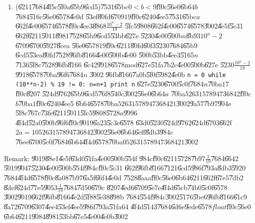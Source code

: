 \documentclass{article}
\begin{document}
\begin{enumerate}
\item (\U{6211}\U{7684}\U{4f5c}\U{5f0a}\U{65b9}\U{6cd5})\U{7531}\U{65bc}$%
0<b<9$\U{ff0c}\U{56e0}\U{6b64}$b$\U{7684}\U{516c}\U{56e0}\U{6578}\U{4e0d}%
\U{53ef}\U{80fd}\U{6709}$19$\U{ff0c}\U{6240}\U{4ee5}\U{7531}\U{65bc}$a$%
\U{662f}\U{4e00}\U{6574}\U{6578}\U{ff0c}\U{4ee3}\U{8868}$\frac{10^{n}-2}{19}$%
\U{5fc5}\U{9808}\U{662f}\U{4e00}\U{6574}\U{6578}\U{3002}\U{4e5f}\U{5c31}%
\U{662f}\U{6211}\U{5011}\U{8981}\U{7528}\U{65b9}\U{6cd5}\U{53bb}\U{627e}%
\U{5230}\U{4e00}\U{500b}$n$\U{8b93}$10^{n}-2$\U{6709}\U{6700}\U{5927}\U{8cea}%
\U{56e0}\U{6578}$19$\U{ff0c}\U{6211}\U{80fd}\U{60f3}\U{5230}\U{7684}\U{65b9}%
\U{6cd5}\U{53ea}\U{80fd}\U{7528}\U{96fb}\U{8166}\U{4e00}\U{500b}\U{4e00}%
\U{500b}\U{53bb}\U{4ee3}\U{5165}$n$\U{7136}\U{5f8c}\U{7528}\U{96fb}\U{8166}%
\U{6c42}\U{9918}\U{6578}mod\U{627e}\U{51fa}\U{7b2c}\U{4e00}\U{500b}\U{627e}%
\U{5230}$\frac{10^{n}-2}{19}$\U{9918}\U{6578}\U{70ba}\U{96f6}\U{7684}$n$%
\U{3002}\newline
\U{96fb}\U{8166}\U{7a0b}\U{5f0f}\U{5982}\U{4e0b}\newline
\texttt{n = 0\newline
while (10**n-2) \% 19 != 0:\newline
\quad n=n+1\newline
print n}\newline
\U{627e}\U{5230}\U{6700}\U{5c0f}\U{7684}$n$\U{70ba}$17$\U{ff0c}\U{8207}%
\U{524d}\U{9762}\U{65b9}\U{6cd5}\U{76f8}\U{540c}\U{3002}\U{56e0}\U{6b64}$a$%
\U{70ba}$5263157894736842$\U{ff0c}$b$\U{70ba}$1$\U{ff0c}\U{6240}\U{4ee5}%
\U{6b64}\U{6578}\U{70ba}$52631578947368421$\U{3002}\U{9a57}\U{7b97}\U{904e}%
\U{5f8c}\U{767c}\U{73fe}\U{6211}\U{5011}\U{5fc5}\U{9808}\U{5728}$a$\U{9996}%
\U{4f4d}\U{52a0}\U{500b}\U{96f6}\U{ff0c}\U{9019}\U{6a23}\U{5c3e}\U{6578}%
\U{63d0}\U{5230}\U{524d}\U{9762}\U{624d}\U{6703}\U{662f}$%
2a=105263157894736842$\U{3002}\U{56e0}\U{6b64}\U{6eff}\U{8db3}\U{984c}%
\U{76ee}\U{6700}\U{5c0f}\U{7684}\U{6b64}\U{4f4d}\U{6578}\U{70ba}$%
052631578947368421$\U{3002}
\end{enumerate}

\bigskip

Remark: \U{9019}\U{88e1}\U{4e5f}\U{63d0}\U{51fa}\U{4e00}\U{500b}\U{554f}%
\U{984c}\U{ff0c}\U{6211}\U{5728}\U{7b97}$\frac{1}{19}$\U{7684}\U{6642}%
\U{5019}\U{9047}\U{5230}\U{4e00}\U{500b}\U{554f}\U{984c}\U{ff0c}\U{5c31}%
\U{662f}\U{96fb}\U{8166}\U{7121}\U{6cd5}\U{986f}\U{793a}\U{8db3}\U{5920}%
\U{7684}\U{4f4d}\U{6578}\U{ff0c}\U{8a08}\U{7b97}\U{6a5f}\U{66f4}\U{4e0d}%
\U{7528}\U{8aaa}\U{ff0c}\U{56e0}\U{6b64}\U{6211}\U{662f}\U{67e5}\U{7db2}%
\U{8def}\U{624d}\U{77e5}\U{9053}$\frac{1}{19}$\U{7684}\U{7d50}\U{679c}%
\U{8207}\U{4ed6}\U{6709}\U{5e7e}\U{4f4d}\U{65cb}\U{74b0}\U{5c0f}\U{6578}%
\U{3002}\U{9019}\U{662f}\U{96fb}\U{8166}\U{4e2d}\U{5f88}\U{5e38}\U{898b}%
\U{7684}\U{554f}\U{984c}\U{3002}\U{5176}\U{5be6}\U{96fb}\U{8166}\U{61c9}%
\U{8a72}\U{6709}\U{6307}\U{4ee4}\U{53ef}\U{4ee5}\U{986f}\U{793a}\U{51fa}$64$%
\U{4f4d}\U{5143}\U{7684}\U{6d6e}\U{9ede}\U{6578}$float$\U{ff0c}\U{56e0}%
\U{6b64}\U{6211}\U{9084}\U{8981}\U{53bb}\U{67e5}\U{4e00}\U{4e0b}\U{3002}
\end{document}

